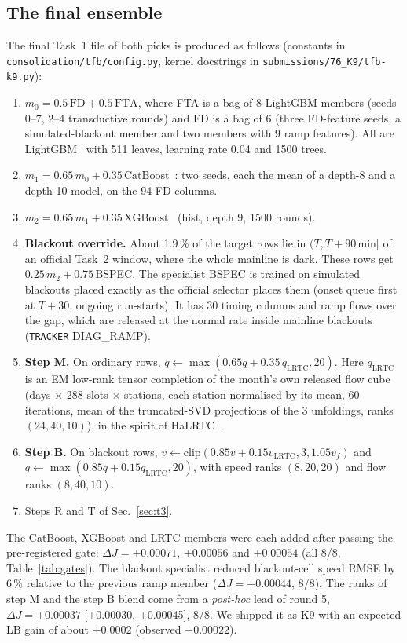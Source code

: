 \documentclass[conference,10pt]{IEEEtran}
\newcommand{\file}[1]{\texttt{\small #1}}
\newcommand{\dJ}{\Delta J}
\begin{document}
\subsection{The final ensemble}
The final Task~1 file of both picks is produced as follows (constants in \file{consolidation/tfb/config.py}, kernel docstrings in
\file{submissions/76\_K9/tfb-k9.py}):
\begin{enumerate}
\item $m_0 = 0.5\,\overline{\text{FD}} + 0.5\,\overline{\text{FTA}}$, where FTA is a bag of 8 LightGBM members (seeds 0--7, 2--4
transductive rounds) and FD is a bag of 6 (three FD-feature seeds, a simulated-blackout member and two members with 9 ramp features).
All are LightGBM~\cite{lgbm} with 511 leaves, learning rate 0.04 and 1500 trees.
\item $m_1 = 0.65\,m_0 + 0.35\,\overline{\text{CatBoost}}$~\cite{catboost}: two seeds, each the mean of a depth-8 and a depth-10 model, on the 94 FD columns.
\item $m_2 = 0.65\,m_1 + 0.35\,\text{XGBoost}$~\cite{xgb} (hist, depth 9, 1500 rounds).
\item \textbf{Blackout override.} About 1.9\,\% of the target rows lie in $(T, T{+}90\,\text{min}]$ of an official Task~2 window, where the whole
mainline is dark. These rows get $0.25\,m_2 + 0.75\,$BSPEC. The specialist BSPEC is trained on simulated blackouts placed exactly as
the official selector places them (onset queue first at $T{+}30$, ongoing run-starts). It has 30 timing columns and ramp flows over the gap,
which are released at the normal rate inside mainline blackouts (\file{TRACKER} DIAG\_RAMP).
\item \textbf{Step M.} On ordinary rows, $q\leftarrow\max(0.65q+0.35\,q_\text{LRTC},20)$. Here $q_\text{LRTC}$ is an EM low-rank tensor
completion of the month's own released flow cube (days $\times$ 288 slots $\times$ stations, each station normalised by its mean,
60 iterations, mean of the truncated-SVD projections of the 3 unfoldings, ranks $(24,40,10)$), in the spirit of
HaLRTC~\cite{liu2013}.
\item \textbf{Step B.} On blackout rows, $v\leftarrow\text{clip}(0.85v+0.15v_\text{LRTC},3,1.05v_f)$ and $q\leftarrow\max(0.85q+0.15q_\text{LRTC},20)$,
with speed ranks $(8,20,20)$ and flow ranks $(8,40,10)$.
\item Steps R and T of Sec.~\ref{sec:t3}.
\end{enumerate}
The CatBoost, XGBoost and LRTC members were each added after passing the pre-registered gate:
$\dJ=+0.00071$, $+0.00056$ and $+0.00054$ (all 8/8, Table~\ref{tab:gates}). The blackout specialist reduced blackout-cell speed RMSE by 6\,\% relative to
the previous ramp member ($\dJ=+0.00044$, 8/8). The ranks of step M and the step B blend come from a \emph{post-hoc} lead of round 5,
$\dJ=+0.00037$ [+0.00030, +0.00045], 8/8. We shipped it as K9 with an expected LB gain of about $+0.0002$ (observed $+0.00022$).
\end{document}

